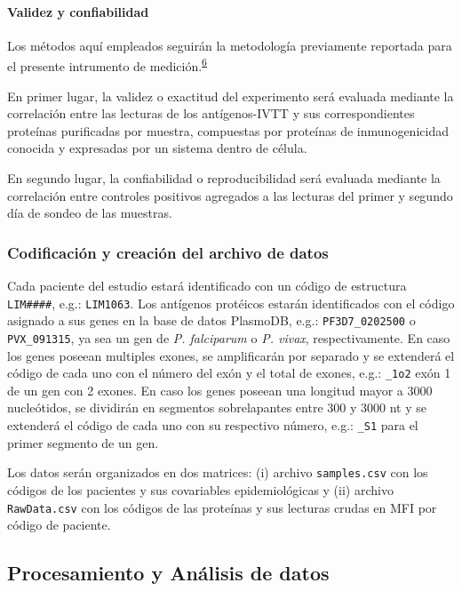 \documentclass[]{article}
\let\oldparagraph\paragraph
\renewcommand{\paragraph}[1]{\oldparagraph{#1}\mbox{}}
\begin{document}
\paragraph{Validez y confiabilidad}\label{validez}

Los métodos aquí empleados seguirán la metodología previamente reportada
para el presente intrumento de
medición.\textsuperscript{\protect\hyperlink{ref-crompton2010}{6}}

En primer lugar, la validez o exactitud del experimento será evaluada
mediante la correlación entre las lecturas de los antígenos-IVTT y sus
correspondientes proteínas purificadas por muestra, compuestas por
proteínas de inmunogenicidad conocida y expresadas por un sistema dentro
de célula.

En segundo lugar, la confiabilidad o reproducibilidad será evaluada
mediante la correlación entre controles positivos agregados a las
lecturas del primer y segundo día de sondeo de las muestras.

\subsubsection{Codificación y creación del archivo de
datos}\label{codificacion-y-creacion-del-archivo-de-datos}

Cada paciente del estudio estará identificado con un código de
estructura \texttt{LIM\#\#\#\#}, e.g.: \texttt{LIM1063}. Los antígenos
protéicos estarán identificados con el código asignado a sus genes en la
base de datos PlasmoDB, e.g.: \texttt{PF3D7\_0202500} o
\texttt{PVX\_091315}, ya sea un gen de \emph{P. falciparum} o \emph{P.
vivax}, respectivamente. En caso los genes poseean multiples exones, se
amplificarán por separado y se extenderá el código de cada uno con el
número del exón y el total de exones, e.g.: \texttt{\_1o2} exón 1 de un
gen con 2 exones. En caso los genes poseean una longitud mayor a 3000
nucleótidos, se dividirán en segmentos sobrelapantes entre 300 y 3000 nt
y se extenderá el código de cada uno con su respectivo número, e.g.:
\texttt{\_S1} para el primer segmento de un gen.

Los datos serán organizados en dos matrices: (i) archivo
\texttt{samples.csv} con los códigos de los pacientes y sus covariables
epidemiológicas y (ii) archivo \texttt{RawData.csv} con los códigos de
las proteínas y sus lecturas crudas en MFI por código de paciente.

\hypertarget{procanal}{\subsection{Procesamiento y Análisis de
datos}\label{procanal}}
\end{document}
